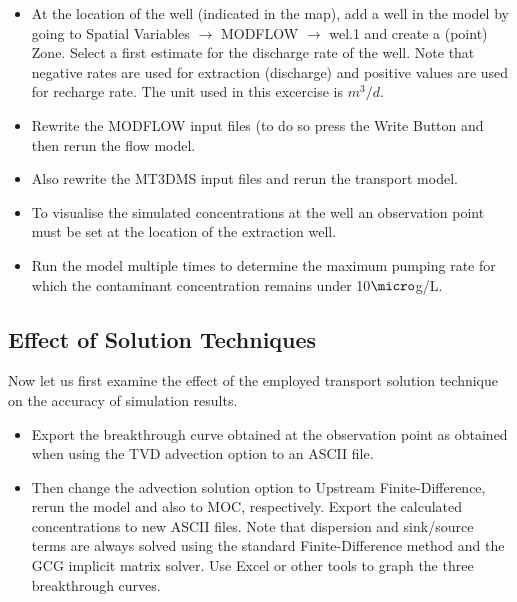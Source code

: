 \begin{itemize}

\item At the location of the well (indicated in the map), 
add a well in the model by going to 
{\color{blue}Spatial Variables} $\rightarrow$ {\color{blue}MODFLOW} $\rightarrow$ 
{\color{blue}wel.1} and create a (point) {\color{blue}Zone}. 
Select a first estimate for the discharge rate of the well. 
Note that negative rates are used for extraction (discharge)
and positive values are used for recharge rate. 
The unit used in this excercise is $m^3/d$.

\item Rewrite the {\color{blue}MODFLOW} input files (to do so press the {\color{blue}Write Button}
and then rerun the flow model.

\item Also rewrite the {\color{blue}MT3DMS} input files and rerun the transport model.

\item To visualise the simulated concentrations at the well an observation point must be
set at the location of the extraction well.

\item Run the model multiple times to determine the maximum pumping rate for which 
the contaminant concentration remains under 10$\micro$g/L.  

\end{itemize}

\subsection{Effect of Solution Techniques}

Now let us first examine the effect of the employed transport solution technique 
on the accuracy of simulation results.

\begin{itemize}
 
\item Export the breakthrough curve obtained at the observation point as obtained when using
the TVD advection option to an ASCII file. 

\item Then change the advection solution option to Upstream Finite-Difference, rerun the model 
and also to MOC, respectively. Export the calculated concentrations to new ASCII files. 
Note that dispersion and sink/source terms are always solved using the standard 
Finite-Difference method and the GCG implicit matrix solver.
Use Excel or other tools to graph the three breakthrough curves.

\end{itemize} 

